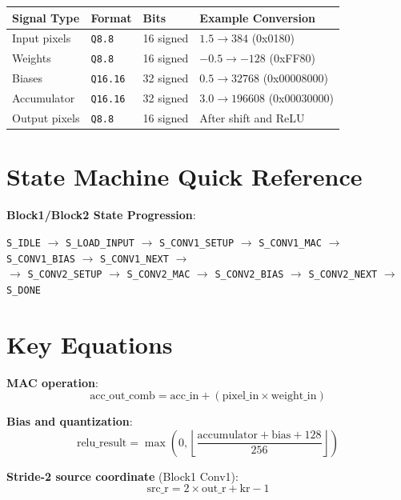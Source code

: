 \documentclass[11pt,a4paper]{report}
\newcommand{\qformat}[1]{\texttt{\color{accentcolor}#1}}
\newcommand{\state}[1]{\texttt{\color{codekeyword}#1}}
\begin{document}
\begin{table}[h]
\centering
\begin{tabular}{@{}llll@{}}
\toprule
\textbf{Signal Type} & \textbf{Format} & \textbf{Bits} & \textbf{Example Conversion} \\
\midrule
Input pixels & \qformat{Q8.8} & 16 signed & $1.5 \rightarrow 384$ (0x0180) \\
Weights & \qformat{Q8.8} & 16 signed & $-0.5 \rightarrow -128$ (0xFF80) \\
Biases & \qformat{Q16.16} & 32 signed & $0.5 \rightarrow 32768$ (0x00008000) \\
Accumulator & \qformat{Q16.16} & 32 signed & $3.0 \rightarrow 196608$ (0x00030000) \\
Output pixels & \qformat{Q8.8} & 16 signed & After shift and ReLU \\
\bottomrule
\end{tabular}
\end{table}

\section{State Machine Quick Reference}

\textbf{Block1/Block2 State Progression}:

\begin{center}
\state{S\_IDLE} $\rightarrow$ \state{S\_LOAD\_INPUT} $\rightarrow$ \state{S\_CONV1\_SETUP} $\rightarrow$ \state{S\_CONV1\_MAC} $\rightarrow$ \state{S\_CONV1\_BIAS} $\rightarrow$ \state{S\_CONV1\_NEXT} $\rightarrow$ \\[0.3em]
$\rightarrow$ \state{S\_CONV2\_SETUP} $\rightarrow$ \state{S\_CONV2\_MAC} $\rightarrow$ \state{S\_CONV2\_BIAS} $\rightarrow$ \state{S\_CONV2\_NEXT} $\rightarrow$ \state{S\_DONE}
\end{center}

\section{Key Equations}

\textbf{MAC operation}:
$$
\text{acc\_out\_comb} = \text{acc\_in} + (\text{pixel\_in} \times \text{weight\_in})
$$

\textbf{Bias and quantization}:
$$
\text{relu\_result} = \max\left(0, \left\lfloor \frac{\text{accumulator} + \text{bias} + 128}{256} \right\rfloor\right)
$$

\textbf{Stride-2 source coordinate} (Block1 Conv1):
$$
\text{src\_r} = 2 \times \text{out\_r} + \text{kr} - 1
$$
\end{document}
